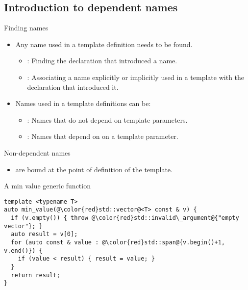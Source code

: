 \subsection{Introduction to dependent names}

\begin{frame}[t,fragile]{Finding names}
\begin{itemize}
  \item Any name used in a template definition needs to be found.
    \begin{itemize}
      \item {}: 
            Finding the declaration that introduced a name.
      \item {}: 
            Associating a name explicitly or implicitly used in a template
            with the declaration that introduced it.
    \end{itemize}

  \item Names used in a template definitions can be:
    \begin{itemize}
      \item {}: 
            Names that do not depend on template parameters.

      \item {}:
            Names that depend on on a template parameter.
    \end{itemize}
\end{itemize}
\end{frame}

\begin{frame}[t,fragile]{Non-dependent names}
\begin{itemize}
  \item {} are bound at the point of definition
        of the template.
\end{itemize}

\begin{block}{A min value generic function}
\begin{lstlisting}[escapechar=@]
template <typename T>
auto min_value(@\color{red}std::vector@<T> const & v) {
  if (v.empty()) { throw @\color{red}std::invalid\_argument@{"empty vector"}; }
  auto result = v[0];
  for (auto const & value : @\color{red}std::span@{v.begin()+1, v.end()}) {
    if (value < result) { result = value; }
  }
  return result;
}
\end{lstlisting}
\end{block}
\end{frame}

